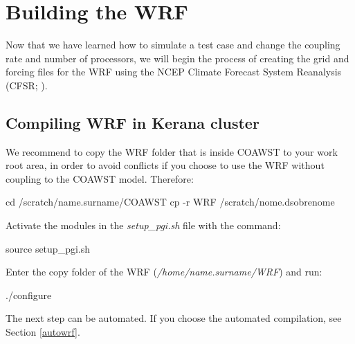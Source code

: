 \chapter{Building the WRF}
\bigskip 
 Now that we have learned how to simulate a test case and change the coupling rate and number of processors, we will begin 
the process of creating the grid and forcing files for the WRF using the NCEP Climate Forecast System Reanalysis (CFSR; \cite{Saha2006}).
\bigskip

\section{Compiling WRF in Kerana cluster}
\bigskip
 We recommend to copy the WRF folder that is inside COAWST to your work root area, in order to avoid conflicts
if you choose to use the WRF without coupling to the COAWST model. Therefore:\bigskip

\begin{bashcode}
cd /scratch/name.surname/COAWST
cp -r WRF /scratch/nome.dsobrenome
\end{bashcode}
\bigskip

 Activate the modules in the \textit{setup\_pgi.sh} file with the command:
\bigskip
\begin{bashcode}
source setup_pgi.sh
\end{bashcode}
\bigskip

 Enter the copy folder of the WRF (\textit{/home/name.surname/WRF}) and run:
\bigskip

\begin{bashcode}
./configure
\end{bashcode}
\bigskip

\begin{tcolorbox}[enhanced,
  grow to left by=0cm,%
  grow to right by=0cm,%
  enlarge top by=0cm,%
  enlarge bottom by=0cm,%
  tcbox raise base,
  boxrule=1.0pt,
  left=18mm,
  colframe=green!50!black,coltext=green!25!black,colback=green!10!white,
  overlay={\begin{tcbclipinterior}\fill[green!75!blue!50!white] (frame.south west)
    rectangle node[text=white,font=\sffamily\bfseries\footnotesize,rotate=0] {NOTE} ([xshift=18mm]frame.north west);\end{tcbclipinterior}}]
The next step can be automated. If you choose the automated compilation, see Section \textcolor{bleu_cite}{\ref{autowrf}}.
\end{tcolorbox}
\bigskip

